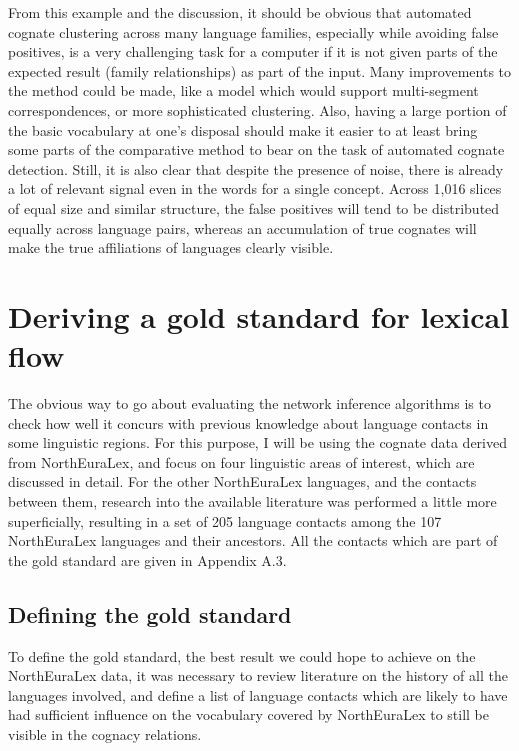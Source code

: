 From this example and the discussion, it should be obvious that automated cognate clustering across many language families, especially while avoiding false positives, is a very challenging task for a computer if it is not given parts of the expected result (family relationships) as part of the input. Many improvements to the method could be made, like a model which would support multi-segment correspondences, or more sophisticated clustering. Also, having a large portion of the basic vocabulary at one's disposal should make it easier to at least bring some parts of the comparative method to bear on the task of automated cognate detection. Still, it is also clear that despite the presence of noise, there is already a lot of relevant signal even in the words for a single concept. Across 1,016 slices of equal size and similar structure, the false positives will tend to be distributed equally across language pairs, whereas an accumulation of true cognates will make the true affiliations of languages clearly 
visible.

\section{Deriving a gold standard for lexical flow}
The obvious way to go about evaluating the network inference algorithms is to check how well it concurs with previous knowledge about language contacts in some linguistic regions. For this purpose, I will be using the cognate data derived from NorthEuraLex, and focus on four linguistic areas of interest, which are discussed in detail. For the other NorthEuraLex languages, and the contacts between them, research into the available literature was performed a little more superficially, resulting in a set of 205 language contacts among the 107 NorthEuraLex languages and their ancestors. All the contacts which are part of the gold standard are given in Appendix A.3.

\subsection{Defining the gold standard}
To define the gold standard, the best result we could hope to achieve on the NorthEuraLex data, it was necessary to review literature on the history of all the languages involved, and define a list of language contacts which are likely to have had sufficient influence on the vocabulary covered by NorthEuraLex to still be visible in the cognacy relations.

